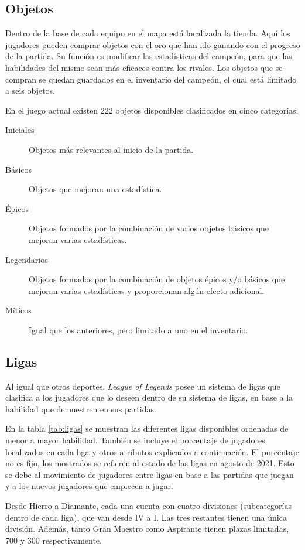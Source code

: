 \subsection{Objetos}
\label{objetos}
Dentro de la base de cada equipo en el mapa está localizada la tienda. Aquí los jugadores pueden comprar objetos con el oro que han ido ganando con el progreso de la partida. Su función es modificar las estadísticas del campeón, para que las habilidades del mismo sean más eficaces contra los rivales. Los objetos que se compran se quedan guardados en el inventario del campeón, el cual está limitado a seis objetos.

En el juego actual existen 222 objetos disponibles clasificados en cinco categorías:
\begin{description}
	\item[Iniciales] Objetos más relevantes al inicio de la partida.
	\item[Básicos] Objetos que mejoran una estadística.
	\item[Épicos] Objetos formados por la combinación de varios objetos básicos que mejoran varias estadísticas.
	\item[Legendarios] Objetos formados por la combinación de objetos épicos y/o básicos que mejoran varias estadísticas y proporcionan algún efecto adicional.
	\item[Míticos] Igual que los anteriores, pero limitado a uno en el inventario.
\end{description}

\subsection{Ligas}
Al igual que otros deportes, \textit{League of Legends} posee un sistema de ligas que clasifica a los jugadores que lo deseen dentro de su sistema de ligas, en base a la habilidad que demuestren en sus partidas.

En la tabla \ref{tab:ligas} se muestran las diferentes ligas disponibles ordenadas de menor a mayor habilidad. También se incluye el porcentaje de jugadores localizados en cada liga\cite{misc:player-distribution} y otros atributos explicados a continuación. El porcentaje no es fijo, los mostrados se refieren al estado de las ligas en agosto de 2021. Esto se debe al movimiento de jugadores entre ligas en base a las partidas que juegan y a los nuevos jugadores que empiecen a jugar.

Desde Hierro a Diamante, cada una cuenta con cuatro divisiones (subcategorías dentro de cada liga), que van desde IV a I. Las tres restantes tienen una única división. Además, tanto Gran Maestro como Aspirante tienen plazas limitadas, 700 y 300 respectivamente.

